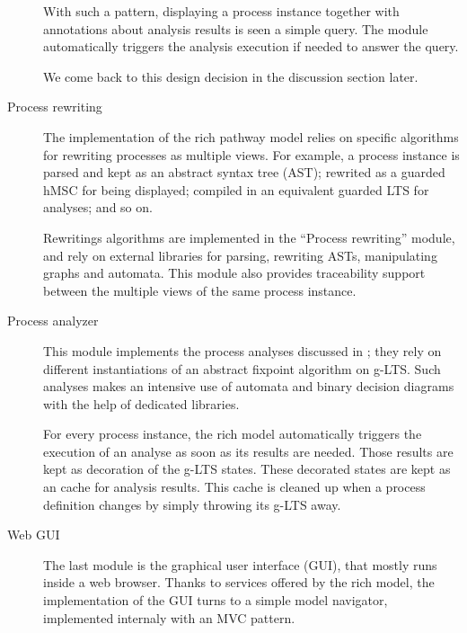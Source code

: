 \begin{description}
With such a pattern, displaying a process instance together with annotations about analysis results is seen a simple query. The module automatically triggers the analysis execution if needed to answer the query. 

We come back to this design decision in the discussion section later.

\item[Process rewriting] The implementation of the rich pathway model relies on specific algorithms for rewriting processes as multiple views. For example, a process instance is parsed and kept as an abstract syntax tree (AST); rewrited as a guarded hMSC for being displayed; compiled in an equivalent guarded LTS for analyses; and so on. 

Rewritings algorithms are implemented in the ``Process rewriting'' module, and rely on external libraries for parsing, rewriting ASTs, manipulating graphs and automata. This module also provides traceability support between the multiple views of the same process instance.

\item[Process analyzer] This module implements the process analyses discussed in \cite{Damas:2011}; they rely on different instantiations of an abstract fixpoint algorithm on g-LTS. Such analyses makes an intensive use of automata and binary decision diagrams with the help of dedicated libraries. 

For every process instance, the rich model automatically triggers the execution of an analyse as soon as its results are needed. Those results are kept as decoration of the g-LTS states. These decorated states are kept as an cache for analysis results. This cache is cleaned up when a process definition changes by simply throwing its g-LTS away.

\item[Web GUI] The last module is the graphical user interface (GUI), that mostly runs inside a web browser. Thanks to services offered by the rich model, the implementation of the GUI turns to a simple model navigator, implemented internaly with an MVC pattern. 


\end{description}
